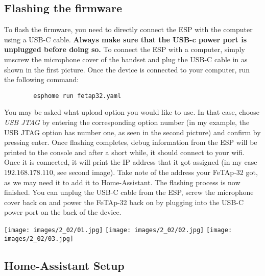 \documentclass[]{article}
\begin{document}
\subsection{Flashing the firmware}
\begin{minipage}[t]{0.4\linewidth}
	\vspace{0pt}
	To flash the firmware, you need to directly connect the ESP with the computer using a USB-C cable. \textbf{Always make sure that the USB-c power port is unplugged before doing so.}
	\newline
	\newline
	To connect the ESP with a computer, simply unscrew the microphone cover of the handset and plug the USB-C cable in as shown in the first picture.
	\newline
	\newline
	Once the device is connected to your computer, run the following command:
	\begin{verbatim}
		esphome run fetap32.yaml
	\end{verbatim}
	You may be asked what upload option you would like to use. In that case, choose \textit{USB JTAG} by entering the corresponding option number (in my example, the USB JTAG option has number one, as seen in the second picture) and confirm by pressing enter.
	\newline
	\newline
	Once flashing completes, debug information from the ESP will be printed to the console and after a short while, it should connect to your wifi. Once it is connected, it will print the IP address that it got assigned (in my case $192.168.178.110$, see second image). Take note of the address your FeTAp-32 got, as we may need it to add it to Home-Assistant.
	\newline
	\newline
	The flashing process is now finished. You can unplug the USB-C cable from the ESP, screw the microphone cover back on and power the FeTAp-32 back on by plugging into the USB-C power port on the back of the device.
\end{minipage}
\hfill
\begin{minipage}[t]{0.5\linewidth}
	\vspace{0pt}
	\texttt{[image: images/2\_02/01.jpg]}
	\texttt{[image: images/2\_02/02.jpg]}
	\texttt{[image: images/2\_02/03.jpg]}
\end{minipage}

\subsection{Home-Assistant Setup}
\end{document}
